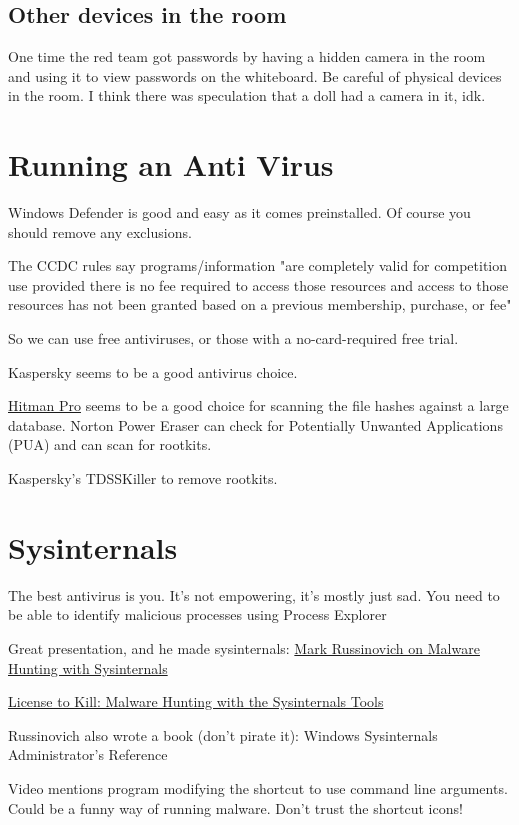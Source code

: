 \documentclass{article}
\begin{document}
\subsection{Other devices in the room}
One time the red team got passwords by having a hidden camera in the room and using it to view passwords on the whiteboard. 
Be careful of physical devices in the room. I think there was speculation that a doll had a camera in it, idk.

\section{Running an Anti Virus}
Windows Defender is good and easy as it comes preinstalled. Of course you should remove any exclusions.

The CCDC rules say programs/information "are completely valid for competition use provided there is no 
fee required to access those resources and access to 
those resources has not been granted based on a previous membership, purchase, or fee"

So we can use free antiviruses, or those with a no-card-required free trial.

Kaspersky seems to be a good antivirus choice.

\href{https://www.sophos.com/en-us/free-tools/hitmanpro}{Hitman Pro}
seems to be a good choice for scanning the file hashes against a large database.
Norton Power Eraser can check for Potentially Unwanted Applications (PUA) and can scan for rootkits.

Kaspersky's TDSSKiller to remove rootkits.

\section{Sysinternals}
The best antivirus is you. It's not empowering, it's mostly just sad.
You need to be able to identify malicious processes using Process Explorer

Great presentation, and he made sysinternals: 
\href{https://youtu.be/vW8eAqZyWeo}{Mark Russinovich on Malware Hunting with Sysinternals}

\href{https://youtu.be/A_TPZxuTzBU}{License to Kill: Malware Hunting with the Sysinternals Tools }

Russinovich also wrote a book (don't pirate it): Windows Sysinternals Administrator’s Reference

Video mentions program modifying the shortcut to use command line arguments. 
Could be a funny way of running malware. Don't trust the shortcut icons!
\end{document}
